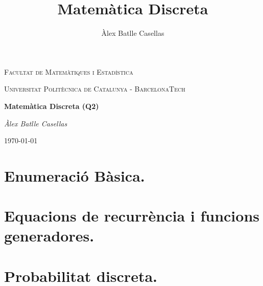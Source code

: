 \documentclass[11pt]{book}
\title{Matemàtica Discreta}
\author{Àlex Batlle Casellas}
\begin{document}
\begin{titlepage}
	\centering
	{\scshape\LARGE Facultat de Matemàtiques i Estadística \par}
	\vspace{1cm}
	{\scshape\Large Universitat Politècnica de Catalunya - BarcelonaTech\par}
	\vspace{1.5cm}
	{\huge\bfseries Matemàtica Discreta (Q2)
	\par}
	\vspace{2cm}
	{\Large\itshape Àlex Batlle Casellas\par}

	\vfill

	{\large \today\par}
\end{titlepage}


\vfill

\tableofcontents
\chapter{Enumeració Bàsica.}
\chapter{Equacions de recurrència i funcions generadores.}
\chapter{Probabilitat discreta.}
\end{document}
